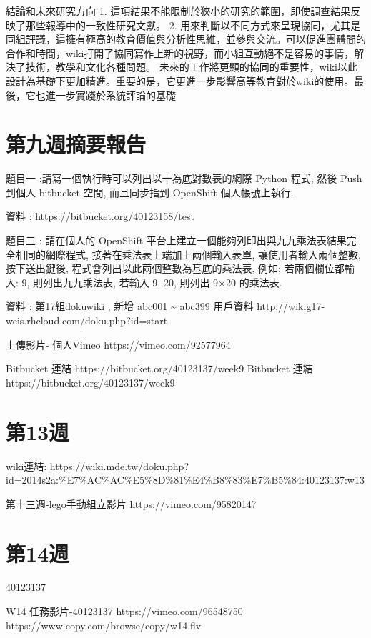 \documentclass[]{article}
\begin{document}
結論和未來研究方向 1.
這項結果不能限制於狹小的研究的範圍，即使調查結果反映了那些報導中的一致性研究文獻。
2.
用來判斷以不同方式來呈現協同，尤其是同組評議，這擁有極高的教育價值與分析性思維，並參與交流。可以促進團體間的合作和時間，wiki打開了協同寫作上新的視野，而小組互動絕不是容易的事情，解決了技術，教學和文化各種問題。
未來的工作將更顯的協同的重要性，wiki以此設計為基礎下更加精進。重要的是，它更進一步影響高等教育對於wiki的使用。最後，它也進一步實踐於系統評論的基礎

\section{第九週摘要報告}\label{ux7b2cux4e5dux9031ux6458ux8981ux5831ux544a}

題目一 :請寫一個執行時可以列出以十為底對數表的網際 Python 程式, 然後
Push 到個人 bitbucket 空間, 而且同步指到 OpenShift 個人帳號上執行.

資料 : https://bitbucket.org/40123158/test

題目三 : 請在個人的 OpenShift
平台上建立一個能夠列印出與九九乘法表結果完全相同的網際程式,
接著在乘法表上端加上兩個輸入表單, 讓使用者輸入兩個整數, 按下送出鍵後,
程式會列出以此兩個整數為基底的乘法表, 例如: 若兩個欄位都輸入: 9,
則列出九九乘法表, 若輸入 9, 20, 則列出 9×20 的乘法表.

資料 : 第17組dokuwiki , 新增 abc001 \textasciitilde{} abc399 用戶資料
http://wikig17-weis.rhcloud.com/doku.php?id=start

上傳影片- 個人Vimeo https://vimeo.com/92577964

Bitbucket 連結 https://bitbucket.org/40123137/week9 Bitbucket 連結
https://bitbucket.org/40123137/week9

\section{第13週}\label{ux7b2c13ux9031}

wiki連結:
https://wiki.mde.tw/doku.php?id=2014s2a:\%E7\%AC\%AC\%E5\%8D\%81\%E4\%B8\%83\%E7\%B5\%84:40123137:w13

第十三週-lego手動組立影片 https://vimeo.com/95820147

\section{第14週}\label{ux7b2c14ux9031}

40123137

W14 任務影片-40123137 https://vimeo.com/96548750
https://www.copy.com/browse/copy/w14.flv
\end{document}

